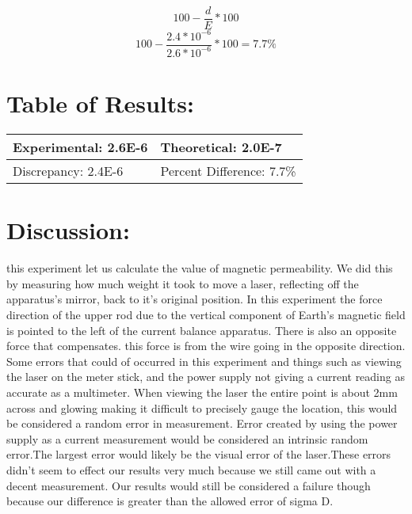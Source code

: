 \documentclass{article}
\begin{document}
\[100-\frac{d}{E} * 100\]
\[100-\frac{2.4*10^{-6}}{2.6*10^{-6}} * 100 = 7.7\%\]
\newpage

\section*{Table of Results:}
\begin{center}
\begin{tabular}{|l|l|}
\hline
	Experimental: 2.6E-6 & Theoretical: 2.0E-7  \\ \hline
	Discrepancy: 2.4E-6   & Percent Difference: 7.7\% \\
\hline
\end{tabular}
\end{center}

\section*{Discussion:}
\doublespace
this experiment let us calculate the value of magnetic permeability.  We did this by measuring how much weight it took to move a laser, reflecting off the apparatus's mirror, back to it's original position.  In this experiment the force direction of the upper rod due to the vertical component of Earth's magnetic field is pointed to the left of the current balance apparatus.  There is also an opposite force that compensates.  this force is from the wire going in the opposite direction.  Some errors that could of occurred in this experiment and things such as viewing the laser on the meter stick, and the power supply not giving a current reading as accurate as a multimeter.  When viewing the laser the entire point is about 2mm across and glowing making it difficult to precisely gauge the location, this would be considered a random error in measurement.  Error created by using the power supply as a current measurement would be considered an intrinsic random error.The largest error would likely be the visual error of the laser.These errors didn't seem to effect our results very much because we still came out with a decent measurement.  Our results would still be considered a failure though because our difference is greater than the allowed error of sigma D.
\end{document}
